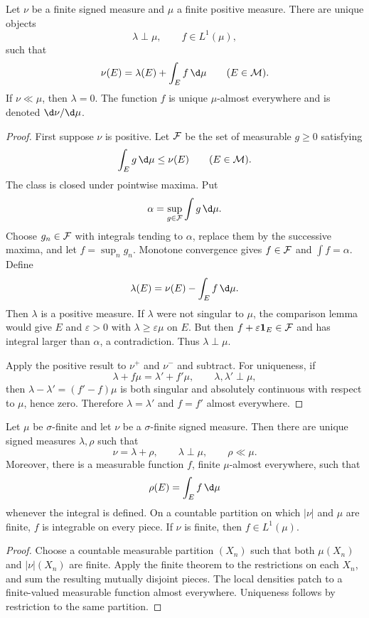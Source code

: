 \begin{thm}
Let $\nu$ be a finite signed measure and $\mu$ a finite positive measure. There are unique objects
\[
\lambda\perp\mu,
\qquad f\in L^1(\mu),
\]
such that
\[
\nu(E)=\lambda(E)+\int_Ef\,\d\mu
\qquad(E\in\cM).
\]
If $\nu\ll\mu$, then $\lambda=0$. The function $f$ is unique $\mu$-almost everywhere and is denoted $\d\nu/\d\mu$.
\end{thm}

\begin{proof}
First suppose $\nu$ is positive. Let $\mathcal{F}$ be the set of measurable $g\geq0$ satisfying
\[
\int_Eg\,\d\mu\leq\nu(E)
\qquad(E\in\cM).
\]
The class is closed under pointwise maxima. Put
\[
\alpha=\sup_{g\in\cF}\int g\,\d\mu.
\]
Choose $g_n\in\mathcal{F}$ with integrals tending to $\alpha$, replace them by the successive maxima, and let $f=\sup_ng_n$. Monotone convergence gives $f\in\mathcal{F}$ and $\int f=\alpha$. Define
\[
\lambda(E)=\nu(E)-\int_Ef\,\d\mu.
\]
Then $\lambda$ is a positive measure. If $\lambda$ were not singular to $\mu$, the comparison lemma would give $E$ and $\varepsilon>0$ with $\lambda\geq\varepsilon\mu$ on $E$. But then $f+\varepsilon\mathbf{1}_E\in\mathcal{F}$ and has integral larger than $\alpha$, a contradiction. Thus $\lambda\perp\mu$.

Apply the positive result to $\nu^+$ and $\nu^-$ and subtract. For uniqueness, if
\[
\lambda+f\mu=\lambda'+f'\mu,
\qquad \lambda,\lambda'\perp\mu,
\]
then $\lambda-\lambda'=(f'-f)\mu$ is both singular and absolutely continuous with respect to $\mu$, hence zero. Therefore $\lambda=\lambda'$ and $f=f'$ almost everywhere.
\end{proof}

\begin{thm}
Let $\mu$ be $\sigma$-finite and let $\nu$ be a $\sigma$-finite signed measure. Then there are unique signed measures $\lambda,\rho$ such that
\[
\nu=\lambda+\rho,
\qquad \lambda\perp\mu,
\qquad \rho\ll\mu.
\]
Moreover, there is a measurable function $f$, finite $\mu$-almost everywhere, such that
\[
\rho(E)=\int_Ef\,\d\mu
\]
whenever the integral is defined. On a countable partition on which $|\nu|$ and $\mu$ are finite, $f$ is integrable on every piece. If $\nu$ is finite, then $f\in L^1(\mu)$.
\end{thm}

\begin{proof}
Choose a countable measurable partition $(X_n)$ such that both $\mu(X_n)$ and $|\nu|(X_n)$ are finite. Apply the finite theorem to the restrictions on each $X_n$, and sum the resulting mutually disjoint pieces. The local densities patch to a finite-valued measurable function almost everywhere. Uniqueness follows by restriction to the same partition.
\end{proof}

